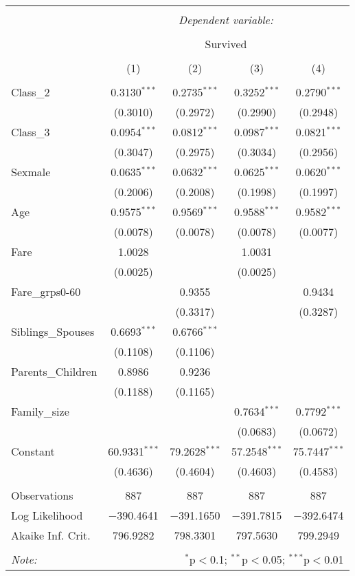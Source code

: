 \documentclass[
]{article}
\begin{document}
\begingroup 
\small 
\begin{tabular}{@{\extracolsep{5pt}}lcccc} 
\\[-1.8ex]\hline 
\hline \\[-1.8ex] 
 & \multicolumn{4}{c}{\textit{Dependent variable:}} \\ 
\cline{2-5} 
\\[-1.8ex] & \multicolumn{4}{c}{Survived} \\ 
\\[-1.8ex] & (1) & (2) & (3) & (4)\\ 
\hline \\[-1.8ex] 
 Class\_2 & 0.3130$^{***}$ & 0.2735$^{***}$ & 0.3252$^{***}$ & 0.2790$^{***}$ \\ 
  & (0.3010) & (0.2972) & (0.2990) & (0.2948) \\ 
  Class\_3 & 0.0954$^{***}$ & 0.0812$^{***}$ & 0.0987$^{***}$ & 0.0821$^{***}$ \\ 
  & (0.3047) & (0.2975) & (0.3034) & (0.2956) \\ 
  Sexmale & 0.0635$^{***}$ & 0.0632$^{***}$ & 0.0625$^{***}$ & 0.0620$^{***}$ \\ 
  & (0.2006) & (0.2008) & (0.1998) & (0.1997) \\ 
  Age & 0.9575$^{***}$ & 0.9569$^{***}$ & 0.9588$^{***}$ & 0.9582$^{***}$ \\ 
  & (0.0078) & (0.0078) & (0.0078) & (0.0077) \\ 
  Fare & 1.0028 &  & 1.0031 &  \\ 
  & (0.0025) &  & (0.0025) &  \\ 
  Fare\_grps0-60 &  & 0.9355 &  & 0.9434 \\ 
  &  & (0.3317) &  & (0.3287) \\ 
  Siblings\_Spouses & 0.6693$^{***}$ & 0.6766$^{***}$ &  &  \\ 
  & (0.1108) & (0.1106) &  &  \\ 
  Parents\_Children & 0.8986 & 0.9236 &  &  \\ 
  & (0.1188) & (0.1165) &  &  \\ 
  Family\_size &  &  & 0.7634$^{***}$ & 0.7792$^{***}$ \\ 
  &  &  & (0.0683) & (0.0672) \\ 
  Constant & 60.9331$^{***}$ & 79.2628$^{***}$ & 57.2548$^{***}$ & 75.7447$^{***}$ \\ 
  & (0.4636) & (0.4604) & (0.4603) & (0.4583) \\ 
 \hline \\[-1.8ex] 
Observations & 887 & 887 & 887 & 887 \\ 
Log Likelihood & $-$390.4641 & $-$391.1650 & $-$391.7815 & $-$392.6474 \\ 
Akaike Inf. Crit. & 796.9282 & 798.3301 & 797.5630 & 799.2949 \\ 
\hline 
\hline \\[-1.8ex] 
\textit{Note:}  & \multicolumn{4}{r}{$^{*}$p$<$0.1; $^{**}$p$<$0.05; $^{***}$p$<$0.01} \\ 
\end{tabular} 
\endgroup
\end{document}

